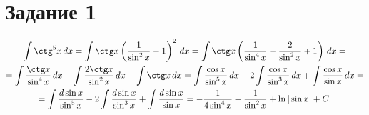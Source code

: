 \section{Задание 1}
\begin{multline*}
    \int \ctg^5 x \, dx = 
        \int \ctg x \left(\frac{1}{\sin^2 x} - 1\right)^2 \, dx = 
        \int \ctg x \left(\frac{1}{\sin^4 x} - 
            \frac{2}{\sin^2 x} + 1\right) \, dx = \\ =
        \int \frac{\ctg x}{\sin^4 x} \, dx - 
            \int \frac{2\ctg x}{\sin^2 x} \, dx + \int \ctg x \, dx =
        \int \frac{\cos x}{\sin^5 x} \, dx - 
            2 \int \frac{\cos x}{\sin^3 x} \, dx + 
            \int \frac{\cos x}{\sin x} \, dx = \\ =
        \int \frac{d \sin x}{\sin^5 x} - 2 \int \frac{d \sin x}{\sin^3 x} +
            \int \frac{d \sin x}{\sin x} = 
            -\frac{1}{4 \sin^4 x} + \frac{1}{\sin^2 x} + \ln |\sin x| + C.
\end{multline*}
